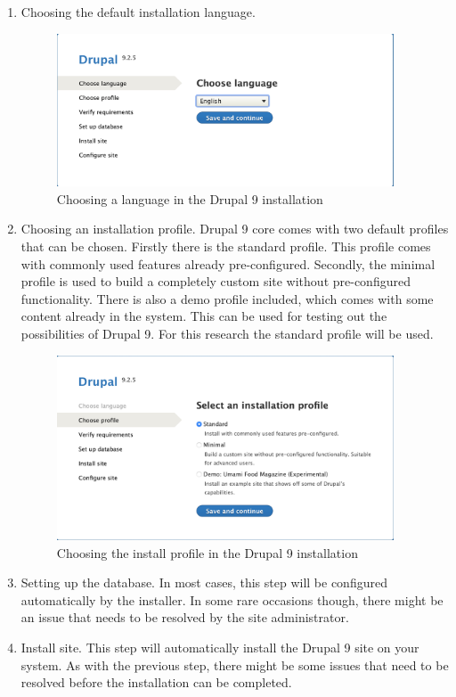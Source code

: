 \begin{enumerate}
	\item Choosing the default installation language.
	\begin{figure}[h]
		\centering
		\includegraphics[width=10cm]{./img/Install_Language.png}
		\caption[Language choice]{Choosing a language in the Drupal 9 installation}
	\end{figure}
	\item Choosing an installation profile. Drupal 9 core comes with two default profiles that can be chosen. Firstly there is the standard profile. This profile comes with commonly used features already pre-configured. Secondly, the minimal profile is used to build a completely custom site without pre-configured functionality. There is also a demo profile included, which comes with some content already in the system. This can be used for testing out the possibilities of Drupal 9. For this research the standard profile will be used.
	\begin{figure}[h]
		\centering
		\includegraphics[width=10cm]{./img/Install_Profile.png}
		\caption[Install Profile Choice]{Choosing the install profile in the Drupal 9 installation}
	\end{figure}
	\item Setting up the database. In most cases, this step will be configured automatically by the installer. In some rare occasions though, there might be an issue that needs to be resolved by the site administrator.
	\item Install site. This step will automatically install the Drupal 9 site on your system. As with the previous step, there might be some issues that need to be resolved before the installation can be completed.

\end{enumerate}
